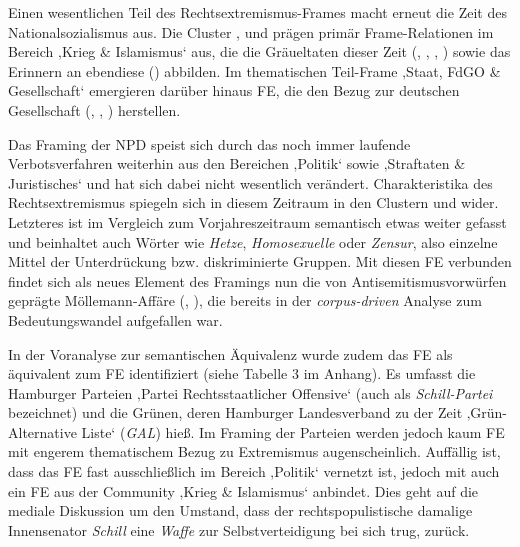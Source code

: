 Einen wesentlichen Teil des Rechtsextremismus-Frames macht erneut die Zeit des Nationalsozialismus aus. Die Cluster ,  und  prägen primär Frame-Relationen im Bereich ‚Krieg \& Islamismus` aus, die die Gräueltaten dieser Zeit (, , , ) sowie das Erinnern an ebendiese () abbilden. Im thematischen Teil-Frame ‚Staat, FdGO \& Gesellschaft` emergieren darüber hinaus FE, die den Bezug zur deutschen Gesellschaft (, , ) herstellen.

Das Framing der NPD speist sich durch das noch immer laufende Verbotsverfahren weiterhin aus den Bereichen ‚Politik` sowie ‚Straftaten \& Juristisches` und hat sich dabei nicht wesentlich verändert. Charakteristika des Rechtsextremismus spiegeln sich in diesem Zeitraum in den Clustern  und  wider. Letzteres ist im Vergleich zum Vorjahreszeitraum semantisch etwas weiter gefasst und beinhaltet auch Wörter wie \emph{Hetze}, \emph{Homosexuelle} oder \emph{Zensur}, also einzelne Mittel der Unterdrückung bzw. diskriminierte Gruppen. Mit diesen FE verbunden findet sich als neues Element des Framings nun die von Antisemitismusvorwürfen geprägte Möllemann-Affäre (, ), die bereits in der \emph{corpus-driven} Analyse zum Bedeutungswandel aufgefallen war.

In der Voranalyse zur semantischen Äquivalenz wurde zudem das FE  als äquivalent zum FE  identifiziert (siehe Tabelle 3 im Anhang). Es umfasst die Hamburger Parteien ‚Partei Rechtsstaatlicher Offensive` (auch als \emph{Schill-Partei} bezeichnet) und die Grünen, deren Hamburger Landesverband zu der Zeit ‚Grün-Alternative Liste` (\emph{GAL}) hieß. Im Framing der Parteien werden jedoch kaum FE mit engerem thematischem Bezug zu Extremismus augenscheinlich. Auffällig ist, dass das FE fast ausschließlich im Bereich ‚Politik` vernetzt ist, jedoch mit  auch ein FE aus der Community ‚Krieg \& Islamismus` anbindet. Dies geht auf die mediale Diskussion um den Umstand, dass der rechtspopulistische damalige Innensenator \emph{Schill} eine \emph{Waffe} zur Selbstverteidigung bei sich trug, zurück.

